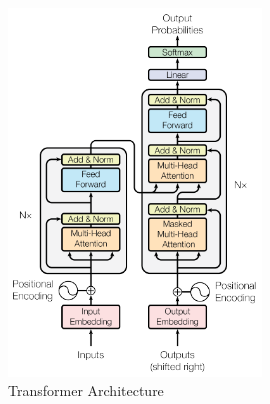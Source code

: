 \begin{figure}[H]
	\centering
	\includegraphics[width=0.6\textwidth]{figures/transformer_architecture.png}
	\caption{Transformer Architecture}
	\label{fig:transformer}
\end{figure}

